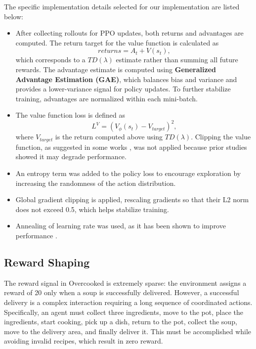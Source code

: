 \documentclass{article}
\begin{document}
The specific implementation details selected for our implementation are listed
below:
\begin{itemize}
    \item After collecting rollouts for PPO updates, both returns and advantages
        are computed. The return target for the value function is calculated as
        $$
        returns = A_t + V(s_t),
        $$
        which corresponds to a $TD(\lambda)$ estimate rather than summing all
        future rewards. The advantage estimate is computed using
        \textbf{Generalized Advantage Estimation (GAE)}, which balances bias
        and variance and provides a lower-variance signal for policy updates.
        To further stabilize training, advantages are normalized within each
        mini-batch.

    \item The value function loss is defined as
        $$
        L^V = (V_{\phi}(s_t) - V_{target})^2,
        $$
        where $V_{target}$ is the return computed above using
        $TD(\lambda)$. Clipping the value function, as suggested in some works
        \cite{huang2022ppo}, was not applied because prior studies
        \cite{andrychowicz2020mattersonpolicyreinforcementlearning} showed it
        may degrade performance.

    \item An entropy term was added to the policy loss to encourage
        exploration by increasing the randomness of the action distribution.

    \item Global gradient clipping is applied, rescaling gradients so that
        their L2 norm does not exceed 0.5, which helps stabilize training.

    \item Annealing of learning rate was used, as it has been shown to improve
        performance \cite{andrychowicz2020mattersonpolicyreinforcementlearning}.

\end{itemize}

\subsection{Reward Shaping}

The reward signal in Overcooked is extremely sparse: the environment assigns a
reward of 20 only when a soup is successfully delivered. However, a successful
delivery is a complex interaction requiring a long sequence of coordinated
actions. Specifically, an agent must collect three ingredients, move to the
pot, place the ingredients, start cooking, pick up a dish, return to the pot,
collect the soup, move to the delivery area, and finally deliver it. This must
be accomplished while avoiding invalid recipes, which result in zero reward.
\end{document}
